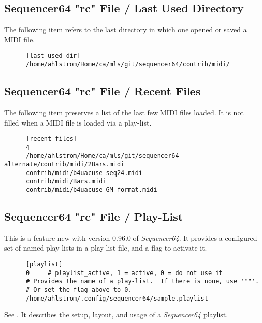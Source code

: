 \subsection{Sequencer64 "rc" File / Last Used Directory}
\label{subsec:seq64_rc_file_last_used_dir}

   The following item refers to the last directory in which one opened or
   saved a MIDI file.

   \begin{verbatim}
      [last-used-dir]
      /home/ahlstrom/Home/ca/mls/git/sequencer64/contrib/midi/
   \end{verbatim}

\subsection{Sequencer64 "rc" File / Recent Files}
\label{subsec:seq64_rc_file_recent_files}

   The following item preserves a list of the last few MIDI files loaded.
   It is not filled when a MIDI file is loaded via a play-list.

   \begin{verbatim}
      [recent-files]
      4
      /home/ahlstrom/Home/ca/mls/git/sequencer64-alternate/contrib/midi/2Bars.midi
      contrib/midi/b4uacuse-seq24.midi
      contrib/midi/Bars.midi
      contrib/midi/b4uacuse-GM-format.midi
   \end{verbatim}

\subsection{Sequencer64 "rc" File / Play-List}
\label{subsec:seq64_rc_file_playlist}

   This is a feature new with version 0.96.0 of \textsl{Sequencer64}.
   It provides a configured set of named play-lists in a play-list file,
   and a flag to activate it.
   
   \index{[playlist]}
   \begin{verbatim}
      [playlist]
      0     # playlist_active, 1 = active, 0 = do not use it
      # Provides the name of a play-list.  If there is none, use '""'.
      # Or set the flag above to 0.
      /home/ahlstrom/.config/sequencer64/sample.playlist
   \end{verbatim}

   See .
   It describes the setup, layout, and usage of a
   \textsl{Sequencer64} playlist.

